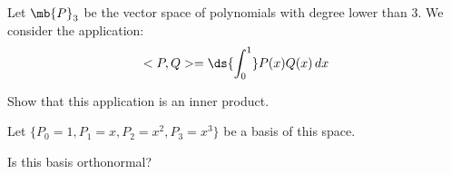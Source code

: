 \bexo
Let $\mb{P}_3$ be the vector space of polynomials with degree lower than $3$. We consider the application:
$$
<P,Q>=\ds{\int_{0}^1} P(x)Q(x)\,dx
$$

Show that this application is an inner product.

Let $\{P_0=1,P_1=x,P_2=x^2,P_3=x^3\}$ be a basis of this space. 

Is this basis orthonormal?
 
\eexo
\solution{
 

}